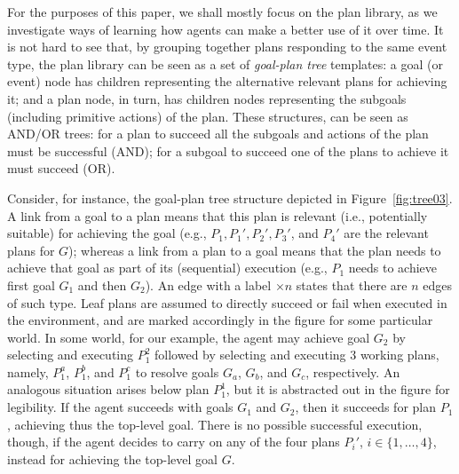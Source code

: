 For the purposes of this paper, we shall mostly focus on the plan library, as we investigate ways of
learning how agents can make a better use of it over time.
%
It is not hard to see that, by grouping together plans responding to the same event type, the
plan library can be seen as a set of \emph{goal-plan tree} templates: a goal (or event) node has
children representing the alternative relevant plans for achieving it; and a plan node,
in turn, has children nodes representing the subgoals (including primitive actions) of the plan. 
%
These structures, can be seen as AND/OR trees: for a plan to succeed all the subgoals and
actions of the plan must be successful (AND); for a subgoal to succeed one of the plans to
achieve it must succeed (OR).

Consider, for instance, the goal-plan tree structure depicted in Figure~\ref{fig:tree03}.
%
A link from a goal to a plan means that this plan is relevant (i.e., potentially suitable)
for achieving the goal (e.g., $P_1,P_1',P_2',P_3'$, and $P_4'$ are the relevant plans for
$G$); whereas a link from a plan to a goal means that the plan needs to achieve that goal as part of
its (sequential) execution (e.g., $P_1$ needs to achieve first goal $G_1$ and then $G_2$). 
%
An edge with a label $\times n$ states that there are $n$ edges of such type. 
%
Leaf plans are assumed to directly succeed or fail when executed in the environment, and are
marked accordingly in the figure for some particular world.
%
In some world, for our example, the agent may achieve goal $G_2$ by
selecting and executing $P_1^2$ followed by selecting and executing $3$
working plans, namely, $P_1^a$, $P_1^b$, and $P_1^c$ to resolve goals $G_a$, $G_b$, and $G_c$,
respectively. An analogous situation arises below plan $P_1^1$, but it is abstracted out in
the figure for legibility. If the agent succeeds with goals $G_1$ and
$G_2$, then it succeeds for plan
$P_1$, achieving thus the top-level goal. There is no possible successful execution, though, if the
agent decides to carry on any of the four plans $P_i'$, $i \in \{1,\ldots,4\}$, instead for
achieving the top-level goal $G$.


